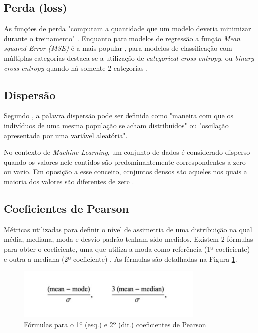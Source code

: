 \subsection{Perda (loss)}
As funções de perda "computam a quantidade que um modelo deveria minimizar durante o treinamento" \cite{keras205}. Enquanto para modelos de regressão a função \textit{Mean squared Error (MSE)} é a mais popular \cite{nhu20}, para modelos de classificação com múltiplas categorias destaca-se a utilização de \textit{categorical cross-entropy}, ou \textit{binary cross-entropy} quando há somente 2 categorias  \cite{rusiecki19}.

\subsection{Dispersão}
Segundo , a palavra dispersão pode ser definida como "maneira com que os indivíduos de uma mesma população se acham distribuídos" ou "oscilação apresentada por uma variável aleatória". 

No contexto de \textit{Machine Learning}, um conjunto de dados é considerado disperso quando os valores nele contidos são predominantemente correspondentes a zero ou vazio. Em oposição a esse conceito, conjuntos densos são aqueles nos quais a maioria dos valores são diferentes de zero \cite{google20}. 

\subsection{Coeficientes de Pearson}
Métricas utilizadas para definir o nível de assimetria de uma distribuição na qual média, mediana, moda e desvio padrão tenham sido medidos. Existem 2 fórmulas para obter o coeficiente, uma que utiliza a moda como referência (1º coeficiente) e outra a mediana (2º coeficiente) \cite{weisstein20b}. As fórmulas são detalhadas na Figura \ref{fig:pearson-sk}.


\begin{figure}[htp]
    \centering
    \includegraphics[width=9cm]{doc/latex/text/images/pearson-sk.jpg}
    \caption{Fórmulas para o 1º (esq.) e 2º (dir.) coeficientes de Pearson}
    \label{fig:pearson-sk}
\end{figure}


